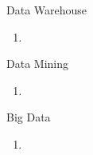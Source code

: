 \documentclass{article}
\begin{document}
\begin{exercise}{Data Warehouse}
  \begin{enumerate}
    \item 
  \end{enumerate}

  \begin{solution}
  \end{solution}
\end{exercise}


\begin{exercise}{Data Mining}
  \begin{enumerate}
    \item 
  \end{enumerate}

  \begin{solution}
  \end{solution}
\end{exercise}


\begin{exercise}{Big Data}
  \begin{enumerate}
    \item 
  \end{enumerate}

  \begin{solution}
  \end{solution}
\end{exercise}
\end{document}
